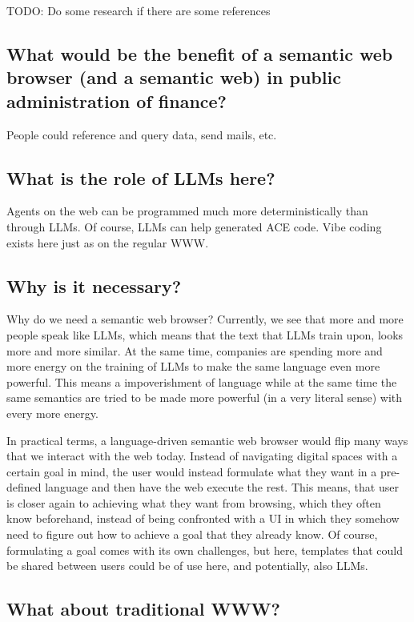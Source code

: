 \documentclass[12pt,a4paper]{article}
\begin{document}
TODO: Do some research if there are some references

\subsection{What would be the benefit of a semantic web browser (and a semantic web) in public administration of finance?}

People could reference and query data, send mails, etc.

\subsection{What is the role of LLMs here?}

Agents on the web can be programmed much more deterministically than through LLMs. Of course, LLMs can help generated ACE code. Vibe coding exists here just as on the regular WWW.

\subsection{Why is it necessary?}

Why do we need a semantic web browser? Currently, we see that more and more people speak like LLMs, which means that the text that LLMs train upon, looks more and more similar. At the same time, companies are spending more and more energy on the training of LLMs to make the same language even more powerful. This means a impoverishment of language while at the same time the same semantics are tried to be made more powerful (in a very literal sense) with every more energy.

In practical terms, a language-driven semantic web browser would flip many ways that we interact with the web today. Instead of navigating digital spaces with a certain goal in mind, the user would instead formulate what they want in a pre-defined language and then have the web execute the rest. This means, that user is closer again to achieving what they want from browsing, which they often know beforehand, instead of being confronted with a UI in which they somehow need to figure out how to achieve a goal that they already know. Of course, formulating a goal comes with its own challenges, but here, templates that could be shared between users could be of use here, and potentially, also LLMs.

\subsection{What about traditional WWW?}
\end{document}
